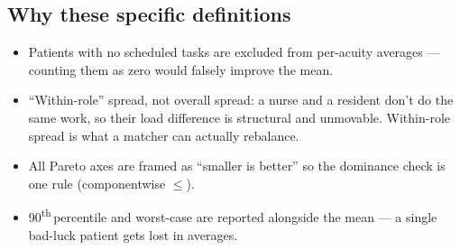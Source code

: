\subsection{Why these specific definitions}

\begin{itemize}
  \item Patients with no scheduled tasks are excluded from
        per-acuity averages --- counting them as zero would falsely
        improve the mean.
  \item ``Within-role'' spread, not overall spread:
        a nurse and a resident don't do the same work, so their
        load difference is structural and unmovable. Within-role
        spread is what a matcher can actually rebalance.
  \item All Pareto axes are framed as ``smaller is better'' so the
        dominance check is one rule (componentwise $\leq$).
  \item 90\textsuperscript{th}\,percentile and worst-case are
        reported alongside the mean --- a single bad-luck patient
        gets lost in averages.
\end{itemize}
